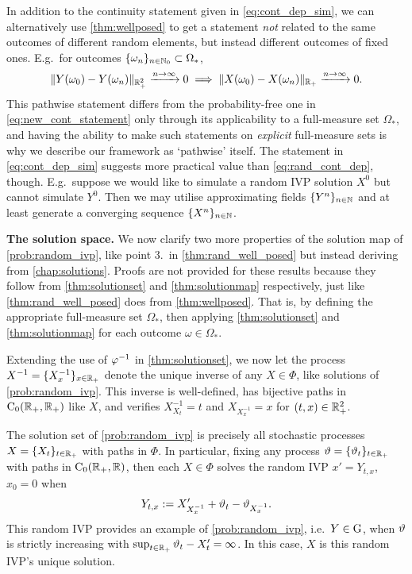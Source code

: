 In addition to the continuity statement given in \autoref{eq:cont_dep_sim}, we can alternatively use \autoref{thm:wellposed} to get a statement \emph{not} related to the same outcomes of different random elements, but instead different outcomes of fixed ones. E.g.~for outcomes $\{\omega_n\}_{n\in\mathbb{N}_0}\subset\Omega_*$,
\begin{equation}\label{eq:rand_cont_dep}
    \Vert Y(\omega_0) - Y(\omega_n) \Vert_{\mathbb{R}^2_+}\xrightarrow{n\to\infty}0 \implies \Vert X(\omega_0) - X(\omega_n) \Vert_{\mathbb{R}_+}\xrightarrow{n\to\infty}0.
\end{equation}
This pathwise statement differs from the probability-free one in \autoref{eq:new_cont_statement} only through its applicability to a full-measure set $\Omega_*$, and having the ability to make such statements on \emph{explicit} full-measure sets is why we describe our framework as `pathwise' itself. The statement in \autoref{eq:cont_dep_sim} suggests more practical value than \autoref{eq:rand_cont_dep}, though. E.g.~suppose we would like to simulate a random IVP solution $X^0$ but cannot simulate $Y^0$. Then we may utilise approximating fields $\{Y^n\}_{n\in\mathbb{N}}$ and at least generate a converging sequence $\{X^n\}_{n\in\mathbb{N}}$.

\vspace{3mm}\textbf{The solution space.} We now clarify two more properties of the solution map of \autoref{prob:random_ivp}, like point 3.~in \autoref{thm:rand_well_posed} but instead deriving from \autoref{chap:solutions}. Proofs are not provided for these results because they follow from \autoref{thm:solutionset} and \autoref{thm:solutionmap} respectively, just like \autoref{thm:rand_well_posed} does from \autoref{thm:wellposed}. That is, by defining the appropriate full-measure set $\Omega_*$, then applying \autoref{thm:solutionset} and \autoref{thm:solutionmap} for each outcome $\omega\in\Omega_*$.

Extending the use of $\varphi^{-1}$ in \autoref{thm:solutionset}, we now let the process $X^{-1}=\{X^{-1}_x\}_{x\in\mathbb{R}_+}$ denote the unique inverse of any $X\in\Phi$, like solutions of \autoref{prob:random_ivp}. This inverse is well-defined, has bijective paths in $\mathrm{C}_0(\mathbb{R}_+,\mathbb{R}_+)$ like $X$, and verifies $X^{-1}_{X_t}=t$ and $X_{X^{-1}_x}=x$ for $(t,x)\in\mathbb{R}_+^2$.

\begin{corollary}\label{thm:solutionset_rand}
    The solution set of \autoref{prob:random_ivp} is precisely all stochastic processes $X=\{X_t\}_{t\in\mathbb{R}_+}$ with paths in $\Phi$. In particular, fixing any process $\vartheta=\{\vartheta_t\}_{t\in\mathbb{R}_+}$ with paths in $\mathrm{C}_0(\mathbb{R}_+,\mathbb{R})$, then each $X\in\Phi$ solves the random IVP $x' = Y_{t,x}$, $x_0=0$ when
    \begin{equation}\label{eq:g_rep_rand}
        Y_{t,x}:=X'_{X^{-1}_x} + \vartheta_t - \vartheta_{X^{-1}_x}.
    \end{equation}
    This random IVP provides an example of \autoref{prob:random_ivp}, i.e.~$Y\in\mathrm{G}$, when $\vartheta$ is strictly increasing with $\sup_{t\in\mathbb{R}_+}\vartheta_t-X'_t=\infty$. In this case, $X$ is this random IVP's unique solution.
\end{corollary}

